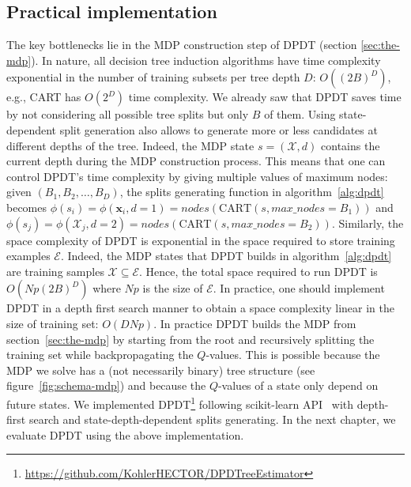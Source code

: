 \subsection{Practical implementation}
The key bottlenecks lie in the MDP construction step of DPDT (section \ref{sec:the-mdp}). In nature, all decision tree induction algorithms have time complexity exponential in the number of training subsets per tree depth $D$: $O((2B)^D)$, e.g., CART has $O(2^D)$ time complexity. We already saw that DPDT saves time by not considering all possible tree splits but only $B$ of them. Using state-dependent split generation also allows to generate more or less candidates at different depths of the tree. Indeed, the MDP state $s = (\mathcal{X},d)$ contains the current depth during the MDP construction process. This means that one can control DPDT's time complexity by giving multiple values of maximum nodes: given $(B_1, B_2,\dots, B_D)$, the splits generating function in algorithm~\ref{alg:dpdt} becomes $\phi(s_i) = \phi(\boldsymbol{x}_i, d=1) = nodes(\text{CART}(s, max\_nodes=B_1))$ and  $\phi(s_j) = \phi(\mathcal{X}_j, d=2) = nodes(\text{CART}(s, max\_nodes=B_2))$.
Similarly, the space complexity of DPDT is exponential in the space required to store training examples $\mathcal E$. Indeed, the MDP states that DPDT builds in algorithm~\ref{alg:dpdt} are training samples $\mathcal X \subseteq \mathcal E$. Hence, the total space required to run DPDT is $O({Np}(2B)^{D})$ where $Np$ is the size of $\mathcal{E}$. In practice, one should implement DPDT in a depth first search manner to obtain a space complexity linear in the size of training set: $O(DNp)$. In practice DPDT builds the MDP from section~\ref{sec:the-mdp} by starting from the root and recursively splitting the training set while backpropagating the $Q$-values. This is possible because the MDP we solve has a (not necessarily binary) tree structure (see figure~\ref{fig:schema-mdp}) and because the $Q$-values of a state only depend on future states. 
We implemented DPDT\footnote{\url{https://github.com/KohlerHECTOR/DPDTreeEstimator}} following scikit-learn API~\cite{sklearn_api} with depth-first search and state-depth-dependent splits generating.
In the next chapter, we evaluate DPDT using the above implementation.